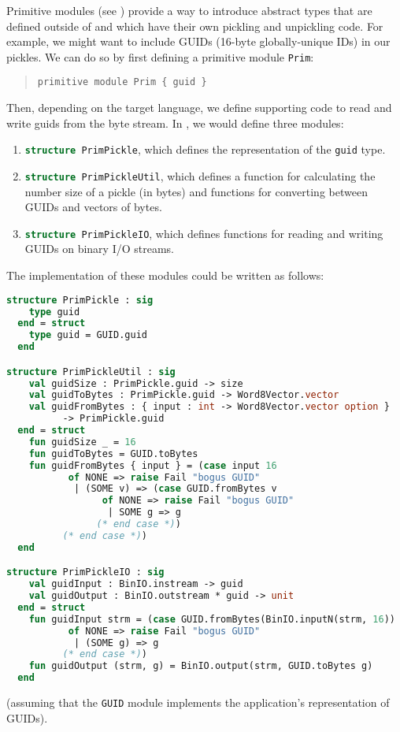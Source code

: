 Primitive modules (see ) provide a way to introduce abstract
types that are defined outside
of \asdl{} and which have their own pickling and unpickling code.
For example, we might want to include GUIDs (16-byte globally-unique IDs) in our pickles.
We can do so by first defining a primitive module \lstinline!Prim!:
%
\begin{quote}\begin{lstlisting}[language=ASDL]
primitive module Prim { guid }
\end{lstlisting}\end{quote}%
%
Then, depending on the target language, we define
supporting code to read and write guids from the byte stream.
In \sml{}, we would define three modules:
\begin{enumerate}
  \item \lstinline[language=SML]!structure PrimPickle!, which defines the representation of the
    \lstinline[language=SML]!guid! type.
  \item
    \lstinline[language=SML]!structure PrimPickleUtil!, which defines a function for calculating
    the number size of a pickle (in bytes) and functions for converting between GUIDs and
    vectors of bytes.
  \item
    \lstinline[language=SML]!structure PrimPickleIO!, which defines functions for reading
    and writing GUIDs on binary I/O streams.
\end{enumerate}%
The \sml{} implementation of these modules could be written as follows:
\begin{code}\begin{lstlisting}[language=SML]
structure PrimPickle : sig
    type guid
  end = struct
    type guid = GUID.guid
  end

structure PrimPickleUtil : sig
    val guidSize : PrimPickle.guid -> size
    val guidToBytes : PrimPickle.guid -> Word8Vector.vector
    val guidFromBytes : { input : int -> Word8Vector.vector option }
          -> PrimPickle.guid
  end = struct
    fun guidSize _ = 16
    fun guidToBytes = GUID.toBytes
    fun guidFromBytes { input } = (case input 16
           of NONE => raise Fail "bogus GUID"
	        | (SOME v) => (case GUID.fromBytes v
                 of NONE => raise Fail "bogus GUID"
	              | SOME g => g
                (* end case *))
	      (* end case *))
  end

structure PrimPickleIO : sig
    val guidInput : BinIO.instream -> guid
    val guidOutput : BinIO.outstream * guid -> unit
  end = struct
    fun guidInput strm = (case GUID.fromBytes(BinIO.inputN(strm, 16))
	       of NONE => raise Fail "bogus GUID"
	        | (SOME g) => g
	      (* end case *))
    fun guidOutput (strm, g) = BinIO.output(strm, GUID.toBytes g)
  end
\end{lstlisting}\end{code}%
(assuming that the \lstinline!GUID! module implements the application's representation
of GUIDs).

